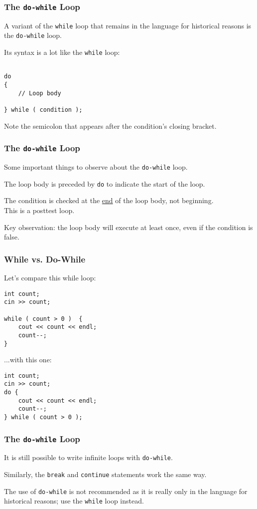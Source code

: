 \begin{frame}[fragile]
\frametitle{The \texttt{do-while} Loop}
A variant of the \texttt{while} loop that remains in the language for historical reasons is the \texttt{do-while} loop.

Its syntax is a lot like the \texttt{while} loop:

\begin{verbatim}

do 
{
    // Loop body

} while ( condition );

\end{verbatim}

Note the semicolon that appears after the condition's closing bracket.

\end{frame}

\begin{frame}
\frametitle{The \texttt{do-while} Loop}

Some important things to observe about the \texttt{do-while} loop.

The loop body is preceded by \texttt{do} to indicate the start of the loop.

The condition is checked at the \underline{end} of the loop body, not beginning.\\
\quad This is a posttest loop.

Key observation: the loop body will execute at least once, even if the condition is false.

\end{frame}

\begin{frame}[fragile]
\frametitle{While vs. Do-While}

Let's compare this while loop:

\begin{verbatim}
int count; 
cin >> count;

while ( count > 0 )  {
    cout << count << endl;
    count--;
}
\end{verbatim}

...with this one:

\begin{verbatim}
int count;
cin >> count;
do {
    cout << count << endl;
    count--;
} while ( count > 0 );
\end{verbatim}


\end{frame}

\begin{frame}
\frametitle{The \texttt{do-while} Loop}

It is still possible to write infinite loops with \texttt{do-while}.

Similarly, the \texttt{break} and \texttt{continue} statements work the same way.

The use of \texttt{do-while} is not recommended as it is really only in the language for historical reasons; use the \texttt{while} loop instead.

\end{frame}



